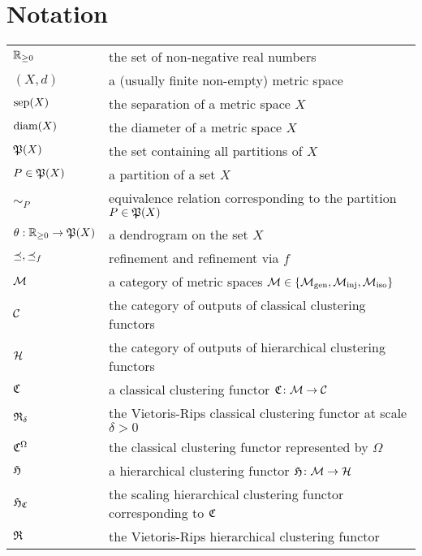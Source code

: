 \chapter{Notation}
\begin{tabular}{ll}
$\R_{\geq0}$ & the set of non-negative real numbers\\

$(X,d)$ & a (usually finite non-empty) metric space\\
$\sep(X)$ & the separation of a metric space $X$\\
$\diam(X)$ & the diameter of a metric space $X$\\

$\P(X)$ & the set containing all partitions of $X$\\
$P \in \P(X)$ & a partition of a set $X$\\
$\sim_P$ & equivalence relation corresponding to the partition $P \in \P(X)$\\

$\theta: \R_{\geq0} \to \P(X)$ & a dendrogram on the set $X$\\

$\refines, \refines_f$ & refinement and refinement via $f$\\

$\M$ & a category of metric spaces $\M \in \{\gen, \inj, \iso\}$\\
$\C$ & the category of outputs of classical clustering functors\\
$\H$ & the category of outputs of hierarchical clustering functors\\

$\Cf$ & a classical clustering functor $\Cf\colon \M \to \C$\\
$\Rf_\delta$ & the Vietoris-Rips classical clustering functor at scale $\delta>0$\\
$\Cf^\Omega$ & the classical clustering functor represented by $\Omega$\\

$\Hf$ & a hierarchical clustering functor $\Hf\colon \M \to \H$\\
$\Hf_\Cf$ & the scaling hierarchical clustering functor corresponding to $\Cf$\\
$\Rf$ & the Vietoris-Rips hierarchical clustering functor\\
\end{tabular}